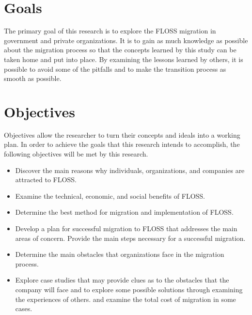 \section{Goals} 

The primary goal of this research is to explore the FLOSS migration in government and private organizations. It is to gain as much knowledge as possible about the migration process so that the concepts learned by this study can be taken home and put into place. By examining the lessons learned by others, it is possible to avoid some of the pitfalls and to make the transition process as smooth as possible.          
                                                                                        
\section{Objectives}
Objectives allow the researcher to turn their concepts and ideals into a working plan. In order to achieve the goals that this research intends to accomplish, the following objectives will be met by this research. 
\begin{itemize}
\item Discover the main reasons why individuals, organizations, and companies are attracted to FLOSS. 
\item Examine the technical, economic, and social benefits of FLOSS.
\item Determine the best method for migration and implementation of FLOSS.
\item Develop a plan for successful migration to FLOSS that addresses the main areas of concern. Provide the main steps necessary for a successful migration.
\item Determine  the main obstacles that organizations face in the migration process.
\item Explore case studies that may provide clues as to the obstacles that the company will face and to explore some possible solutions through examining the experiences of others. and examine the total cost of migration in some cases.
\end{itemize}
